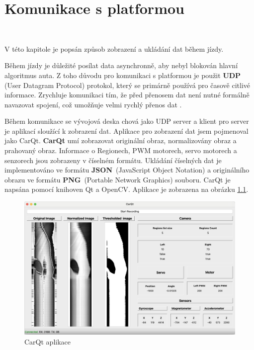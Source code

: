 \chapter{Komunikace s platformou}
\label{sec:PlatformCommunication}
\vspace{-20pt}
\

V této kapitole je popsán způsob zobrazení a ukládání dat během jízdy.

Během jízdy je důležité posílat data asynchronně, aby nebyl blokován hlavní
algoritmus auta. Z toho důvodu pro komunikaci s platformou je použit \textbf{UDP}
(User Datagram Protocol) protokol, který se primárně používá pro časově citlivé
informace. Zrychluje komunikaci tím, že před přenosem dat není nutné formálně
navazovat spojení, což umožňuje velmi rychlý přenos dat \cite{UDP}.

Během komunikace se vývojová deska chová jako UDP server a klient pro server je
aplikací sloužící k zobrazení dat. Aplikace pro zobrazení dat jsem pojmenoval jako
CarQt. \textbf{CarQt} umí zobrazovat originální obraz, normalizovány obraz a
prahovaný obraz. Informace o Regionech, PWM motorech, servo motorech a senzorech
jsou zobrazeny v číselném formátu. Ukládání číselných dat je implementováno ve
formátu \textbf{JSON}~(JavaScript Object Notation) a originálního obrazu ve formátu
\textbf{PNG}~(Portable Network Graphics) souboru. CarQt je napsána pomocí knihoven
Qt a OpenCV. Aplikace je zobrazena na obrázku \ref{fig:CarQt}.
\begin{figure}[!h]
    \centering
    \includegraphics[width = .7\linewidth]{Figures/CarQt.png}
    \caption{CarQt aplikace}
    \label{fig:CarQt}
\end{figure}

